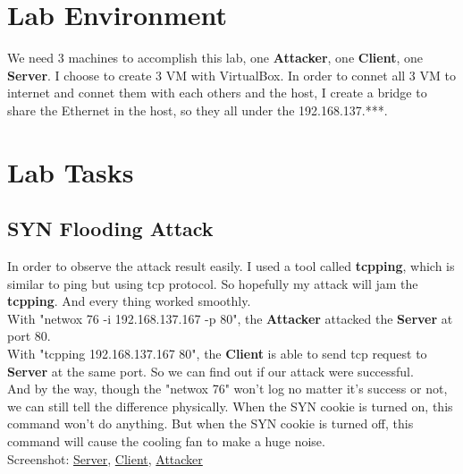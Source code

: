 \documentclass{article}
\begin{document}
\maketitle
\section{Lab Environment}
We need 3 machines to accomplish this lab, one \textbf{Attacker}, one \textbf{Client}, one \textbf{Server}. I choose to create 3 VM with VirtualBox. In order to connet all 3 VM to internet and connet them with each others and the host, I create a bridge to share the Ethernet in the host, so they all under the 192.168.137.***.
\section{Lab Tasks}
\subsection{SYN Flooding Attack}
In order to observe the attack result easily. I used a tool called \textbf{tcpping}, which is similar to ping but using tcp protocol. So hopefully my attack will jam the \textbf{tcpping}. And every thing worked smoothly.\\
With {\ttfamily "netwox 76 -i 192.168.137.167 -p 80"}, the \textbf{Attacker} attacked the \textbf{Server} at port 80.\\
With {\ttfamily "tcpping 192.168.137.167 80"}, the \textbf{Client} is able to send tcp request to \textbf{Server} at the same port. So we can find out if our attack were successful.\\
And by the way, though the {\ttfamily "netwox 76"} won't log no matter it's success or not, we can still tell the difference physically. When the SYN cookie is turned on, this command won't do anything. But when the SYN cookie is turned off, this command will cause the cooling fan to make a huge noise.\\
Screenshot: 
\href{https://i.loli.net/2018/09/05/5b8f645f3315a.png}{Server}, 
\href{https://i.loli.net/2018/09/05/5b8f645f325cf.png}{Client}, 
\href{https://i.loli.net/2018/09/05/5b8f645f31ca2.png}{Attacker}
\end{document}
